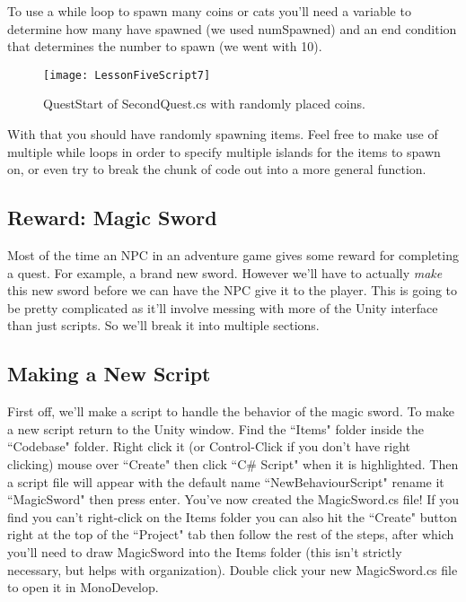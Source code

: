 \documentclass{article}
\begin{document}
To use a while loop to spawn many coins or cats you'll need a variable to determine how many have spawned (we used numSpawned) and an end condition that determines the number to spawn (we went with 10). 

\begin{figure}
  \texttt{[image: LessonFiveScript7]}
  \caption{QuestStart of SecondQuest.cs with randomly placed coins.}
  \label{fig:LessonFiveScript7}
\end{figure}

\noindent{}

With that you should have randomly spawning items. Feel free to make use of multiple while loops in order to specify multiple islands for the items to spawn on, or even try to break the chunk of code out into a more general function. 

\subsection{Reward: Magic Sword}

Most of the time an NPC in an adventure game gives some reward for completing a quest. For example, a brand new sword. However we'll have to actually \textit{make} this new sword before we can have the NPC give it to the player. This is going to be pretty complicated as it'll involve messing with more of the Unity interface than just scripts. So we'll break it into multiple sections. 

\subsection{Making a New Script}

First off, we'll make a script to handle the behavior of the magic sword. To make a new script return to the Unity window. Find the ``Items" folder inside the ``Codebase" folder. Right click it (or Control-Click if you don't have right clicking) mouse over ``Create" then click ``C\# Script" when it is highlighted. Then a script file will appear with the default name ``NewBehaviourScript" rename it ``MagicSword" then press enter. You've now created the MagicSword.cs file! If you find you can't right-click on the Items folder you can also hit the ``Create" button right at the top of the ``Project" tab then follow the rest of the steps, after which you'll need to draw MagicSword into the Items folder (this isn't strictly necessary, but helps with organization). Double click your new MagicSword.cs file to open it in MonoDevelop. 
\end{document}

